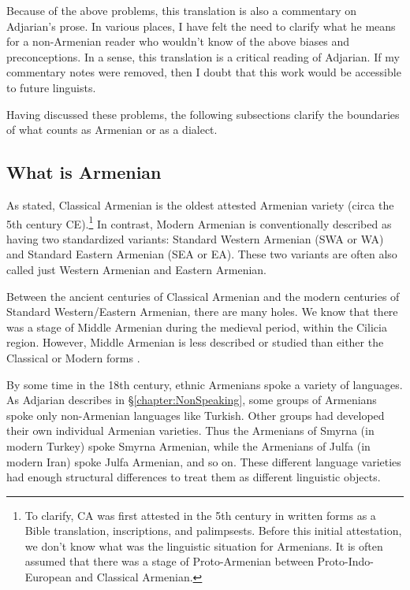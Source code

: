 Because of the above problems, this translation is also a commentary on Adjarian's prose. In various places, I have felt the need to clarify what he means for a non-Armenian reader who wouldn't know of the above biases and preconceptions. In a sense, this translation is a critical reading of Adjarian. If my commentary notes were removed, then I doubt that this work would be accessible to future linguists.


Having discussed these problems, the following subsections clarify the boundaries of what counts as Armenian or as a dialect. 

\subsection{What is Armenian}\label{sec:HossepIntro:armenian:whatisarm}

As stated, Classical Armenian is the oldest attested Armenian variety (circa the 5th century CE).\footnote{To clarify, CA was first attested in the 5th century in written forms as a Bible translation, inscriptions, and palimpsests. Before this initial attestation, we don't know what was the linguistic situation for Armenians. It is often assumed that there was a stage of Proto-Armenian between Proto-Indo-European and Classical Armenian.} In contrast, Modern Armenian is conventionally described as having two standardized variants: Standard Western Armenian (SWA or WA) and Standard Eastern Armenian (SEA or EA). These two variants are often also called just Western Armenian and Eastern Armenian. 

Between the ancient centuries of Classical Armenian and the modern centuries of Standard Western/Eastern Armenian, there are many holes. We know that there was a stage of Middle Armenian during the medieval period, within the Cilicia region. However, Middle Armenian is less described or studied than either the Classical or Modern forms \citep{Karst-1901-MiddleArmenain}. 

By some time in the 18th century, ethnic Armenians spoke a variety of languages. As Adjarian describes in \S\ref{chapter:NonSpeaking}, some groups of Armenians spoke only non-Armenian languages like Turkish. Other groups had developed their own individual Armenian varieties. Thus the Armenians of Smyrna (in modern Turkey) spoke Smyrna Armenian, while the Armenians of Julfa (in modern Iran) spoke Julfa Armenian, and so on. These different language varieties had enough structural differences to treat them as different linguistic objects. 


